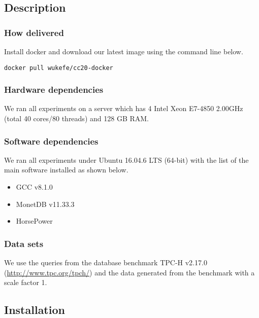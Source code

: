 {\subsection{Description}

\subsubsection{How delivered}

Install docker and download our latest image using the command line below.

\begin{verbatim}
docker pull wukefe/cc20-docker
\end{verbatim}

\subsubsection{Hardware dependencies}

We ran all experiments on a server which has 4 Intel Xeon E7-4850 2.00GHz
(total 40 cores/80 threads) and 128 GB RAM.

\subsubsection{Software dependencies}

We ran all experiments under Ubuntu 16.04.6 LTS (64-bit) with the list of the main software installed as shown below.

\begin{itemize}
\item GCC v8.1.0
\item MonetDB v11.33.3
\item HorsePower
\end{itemize}

\subsubsection{Data sets}

We use the queries from the database benchmark TPC-H v2.17.0 (\url{http://www.tpc.org/tpch/}) and the data
generated from the benchmark with a scale factor 1.

\subsection{Installation}

}

